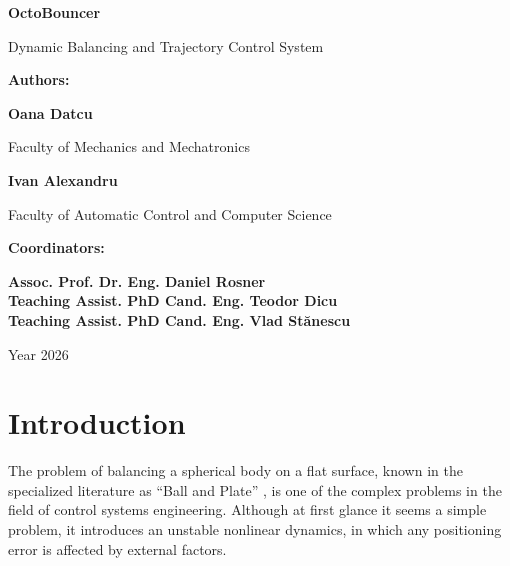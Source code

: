 \documentclass[12pt,a4paper]{report}
\begin{document}
\begin{titlepage}
    \centering
    \vspace*{3cm}
    {\Huge \textbf{OctoBouncer} \par}
    \vspace{1.5cm}
    {\Large Dynamic Balancing and Trajectory Control System \par}
    \vspace{4cm}
    {\large \textbf{Authors:} \par}
    \vspace{0.8cm}
    {\Large \textbf{Oana Datcu}} \\
    {\small Faculty of Mechanics and Mechatronics \par}
    \vspace{1cm}
    {\Large \textbf{Ivan Alexandru}} \\
    {\small Faculty of Automatic Control and Computer Science \par}
    \vspace{2cm}
    {\large \textbf{Coordinators:} \par}
    \vspace{0.8cm}
    {\Large \textbf{Assoc. Prof. Dr. Eng. Daniel Rosner}} \\
    \vspace{0.2cm}
    {\Large \textbf{Teaching Assist. PhD Cand. Eng. Teodor Dicu}} \\
    \vspace{0.2cm}
    {\Large \textbf{Teaching Assist. PhD Cand. Eng. Vlad Stănescu}} \\
    \vfill
    {\large Year 2026 \par}
\end{titlepage}

\newpage
{}
\tableofcontents
\newpage
{}

\chapter{Introduction}
\label{chap:intro}

The problem of balancing a spherical body on a flat surface, known in the specialized literature as ``Ball and Plate'' \cite{ball_plate_model}, is one of the complex problems in the field of control systems engineering. Although at first glance it seems a simple problem, it introduces an unstable nonlinear dynamics, in which any positioning error is affected by external factors.
\end{document}
